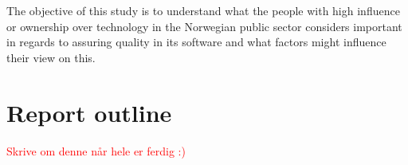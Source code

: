 
The objective of this study is to understand what the people with high influence or ownership over technology in the Norwegian public sector considers important in regards to assuring quality in its software and what factors might influence their view on this.
 

\section{Report outline}

\textcolor{red}{Skrive om denne når hele er ferdig :)}